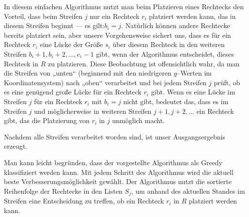 In diesem einfachen Algorithmus nutzt man beim Platzieren eines Rechtecks den
Vorteil, dass beim Streifen $j$ nur ein Rechteck $r_i$ platziert werden kann, 
das in diesem Streifen beginnt --- es gilt:\break $b_i = j$.
Natürlich können andere Rechtecke bereits platziert sein,
aber unsere Vorgehensweise sichert uns, dass es für ein Rechteck $r_i$
eine Lücke der Größe $s_i$ über diesem Rechteck 
in den weiteren Streifen ${b_i + 1}, b_i + 2, ..., e_i - 1$ 
gibt, wenn der Algorithmus entscheidet, dieses Rechteck in $R$ zu platzieren.
Diese Beobachtung ist offensichtlich wahr, da man die Streifen von „unten“ 
(beginnend mit den niedrigeren $y$--Werten im Koordinatensystem) nach „oben“
verarbeitet und bei jedem Streifen $j$ prüft, ob es eine genügend große Lücke für ein Rechteck
$r_i$ gibt.
Wenn es eine Lücke im Streifen $j$ für ein Rechteck $r_i$ mit $b_i = j$ nicht gibt,
bedeutet das, dass es im Streifen $j$ und 
möglicherweise in weiteren Streifen $j+1, j+2, ...$ ein Rechteck gibt, das 
die Platzierung von $r_i$ in $j$ unmöglich macht.

Nachdem alle Streifen verarbeitet worden sind, ist unser Ausgangsergebnis erzeugt.

Man kann leicht begründen, dass der vorgestellte Algorithmus als Greedy klassifiziert werden
kann.
Mit jedem Schritt des Algorithmus wird die aktuell beste Verbesserungsmöglichkeit gewählt.
Der Algorithmus nutzt die sortierte Reihenfolge der Rechtecke in den Listen $S_j$, um anhand
des aktuellen Standes im Streifen eine Entscheidung zu treffen, ob ein Rechteck $r_i$ in $R$
platziert werden kann.



